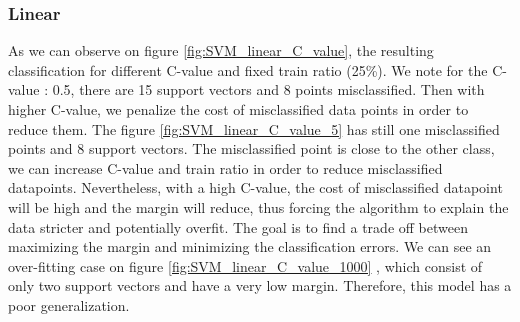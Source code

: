\subsubsection{Linear}
As we can observe on figure \ref{fig:SVM_linear_C_value}, the resulting classification for different C-value and fixed train ratio (25\%). We note for the C-value : 0.5, there are 15 support vectors and 8 points misclassified. Then with higher C-value, we penalize the cost of misclassified data points in order to reduce them. The figure \ref{fig:SVM_linear_C_value_5} has still one misclassified points and 8 support vectors. The misclassified point is close to the other class, we can increase C-value and train ratio in order to reduce misclassified datapoints. Nevertheless, with a high C-value, the cost of misclassified datapoint will be high and the margin will reduce, thus forcing the algorithm to explain the data stricter and potentially overfit. The goal is to find a trade off between maximizing the margin and minimizing the classification errors. We can see an over-fitting case on figure \ref{fig:SVM_linear_C_value_1000}%
, which consist of only two support vectors and have a very low margin. Therefore, this model has a poor generalization.



